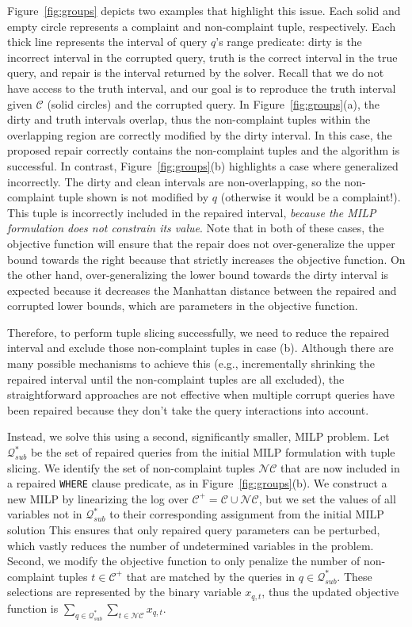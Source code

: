 Figure~\ref{fig:groups} depicts two examples that highlight this issue.
Each solid and empty circle represents a complaint and non-complaint tuple, respectively.
Each thick line represents the interval of query $q$'s range predicate: 
dirty is the incorrect interval in the corrupted query,
truth is the correct interval in the true query, 
and repair is the interval returned by the solver.
Recall that we do not have access to the truth interval, and our goal is to reproduce the 
truth interval given $\mathcal{C}$ (solid circles) and the corrupted query.
% 
In Figure~\ref{fig:groups}(a), the dirty and truth intervals overlap, thus the non-complaint tuples 
within the overlapping region are correctly modified by the dirty interval.  
In this case, the proposed repair correctly contains the non-complaint tuples and the algorithm is successful.
In contrast, Figure~\ref{fig:groups}(b) highlights a case where \naive generalized incorrectly.
The dirty and clean intervals are non-overlapping, so the non-complaint tuple shown is not modified by $q$ (otherwise it would be a complaint!). This tuple is incorrectly included in the repaired interval, \emph{because the MILP formulation does not constrain its value}.
Note that in both of these cases, the objective function will ensure that the repair
does not over-generalize the upper bound towards the right because that strictly increases the objective function.
On the other hand, over-generalizing the lower bound towards the dirty interval
is expected because it decreases the Manhattan distance between the repaired and corrupted lower bounds,
which are parameters in the objective function.

Therefore, to perform tuple slicing successfully, we need to reduce the repaired interval and exclude those non-complaint tuples in case (b).  
Although there are many possible mechanisms to achieve this (e.g., incrementally shrinking
the repaired interval until the non-complaint tuples are all excluded), 
the straightforward approaches are not effective when multiple corrupt 
queries have been repaired because they don't take the query interactions into account.

Instead, we solve this using a second, significantly smaller, MILP problem.   
Let $\mathcal{Q}^*_{sub}$ be the set of repaired queries from the  initial MILP formulation with tuple slicing.
We identify the set of non-complaint tuples $\mathcal{NC}$ that are now included in a repaired \texttt{WHERE} clause predicate, as in Figure~\ref{fig:groups}(b). We construct a new MILP by linearizing the log over $\mathcal{C}^+ = \mathcal{C} \cup \mathcal{NC}$, but we set the values of all variables not in $\mathcal{Q}^*_{sub}$ to their corresponding assignment from the initial MILP solution
This ensures that only repaired query parameters can
be perturbed, which vastly reduces the number of undetermined variables in the problem.
Second, we modify the objective function to only penalize the number of non-complaint tuples 
$t \in \mathcal{C}^+$ that are matched by the queries in $q \in \mathcal{Q}^*_{sub}$.
These selections are represented by the binary variable $x_{q, t}$, thus the updated objective function
is $\sum_{q \in \mathcal{Q}^*_{sub}} \sum_{t \in \mathcal{NC}} x_{q,t}$.


